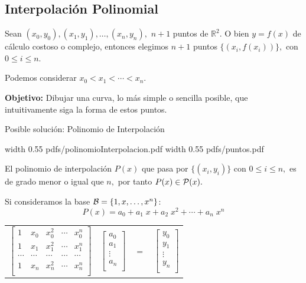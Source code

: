 \documentclass[twoside]{report}
\newcommand{\colocapdf}[2]{\quad\pdfimage width #2 {pdfs/#1.pdf}}
\begin{document}
\subsection{Interpolación Polinomial}

Sean $(x_0,y_0), (x_1,y_1),\ldots,(x_n,y_n),$ $n+1$ puntos de $\mathbb{R}^2.$ O bien $y=f(x)$ de c\'{a}lculo costoso o complejo, entonces elegimos $n+1$ puntos $\{(x_i,f(x_i))\},$ con $0\leq i\leq n.$

Podemos considerar $x_0<x_1<\cdots <x_n$.

{\bf Objetivo:} Dibujar una curva, lo m\'{a}s simple o sencilla posible, que intuitivamente siga la forma de  estos puntos.

Posible soluci\'{o}n: Polinomio de Interpolación

%
%
%
%

\begin{center}
\colocapdf{polinomioInterpolacion}{0.55\textwidth}
\colocapdf{puntos}{0.55\textwidth}
\end{center}

El polinomio de interpolaci\'{o}n $P(x)$ que pasa por $\{(x_i,y_i)\}$ con $0\leq i \leq n,$ es de grado menor o igual que $n,$ por tanto $P(x)\in {\cal P}(x).$

Si consideramos la base ${\cal B}=\{1,x,\ldots,x^n\}$:
$$P(x)=a_0+a_1 \;x+a_2\; x^2+\cdots+a_n \;x^n$$

\begin{center}
\begin{tabular}{cccc} $\left[ \begin{array}{ccccc}
1&x_0&x_0^2&\cdots&x_0^n\\
1&x_1&x_1^2&\cdots&x_1^n\\
\cdots&\cdots&\cdots&\cdots&\cdots\\
1&x_n&x_n^2&\cdots&x_n^n\\
\end{array} \right]$ & $\left[ \begin{array}{c} a_0\\a_1\\ \vdots \\ a_n \\ \end{array} \right] $& $=$ &
$\left[ \begin{array}{c} y_0\\y_1\\ \vdots \\ y_n \\
\end{array}\right]$
\end{tabular}
\end{center}
\end{document}
